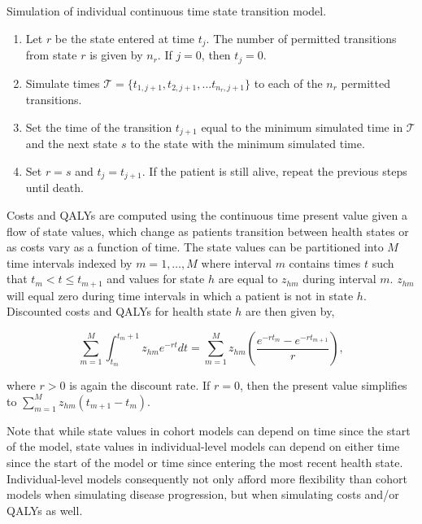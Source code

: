 \documentclass[article, nojss]{jss}\usepackage[]{graphicx}\usepackage[]{color}
\begin{document}
\begin{algorithm}
\caption{Simulation of individual continuous time state transition model.}
\label{alg:sim-ictstm}
\begin{enumerate}
\item Let $r$ be the state entered at time $t_j$. The number of permitted transitions from state $r$ is given by $n_r$. If $j=0$, then $t_j = 0$. 
\item Simulate times $\mathcal{T} = \{t_{1, j+1}, t_{2, j+1}, \ldots t_{n_r, j+1}\}$ to each of the $n_r$ permitted transitions.
\item Set the time of the transition $t_{j+1}$ equal to the minimum simulated time in $\mathcal{T}$ and the next state $s$ to the state with the minimum simulated time.
\item Set $r=s$ and $t_j = t_{j+1}$. If the patient is still alive, repeat the previous steps until death.
\end{enumerate}
\end{algorithm}

Costs and QALYs are computed using the continuous time present value given a flow of state values, which change as patients transition between health states or as costs vary as a function of time. The state values can be partitioned into $M$ time intervals indexed by $m = 1,\ldots, M$ where interval $m$ contains times $t$ such that $t_m < t \leq t_{m+1}$ and values for state $h$ are equal to $z_{hm}$ during interval $m$. $z_{hm}$ will equal zero during time intervals in which a patient is not in state $h$. Discounted costs and QALYs for health state $h$ are then given by,  

\begin{equation}
\sum_{m = 1}^M \int_{t_m}^{t_m+1} z_{hm}e^{-rt}dt = \sum_{m = 1}^M z_{hm} \left(\frac{e^{-r{t_{m}}} - e^{-r{t_{m+1}}}}{r}\right),
\end{equation}

where $r > 0$ is again the discount rate. If $r = 0$, then the present value simplifies to $\sum_{m = 1}^M z_{hm}(t_{m+1} - t_{m})$. 

Note that while state values in cohort models can depend on time since the start of the model, state values in individual-level models can depend on either time since the start of the model or time since entering the most recent health state. Individual-level models consequently not only afford more flexibility than cohort models when simulating disease progression, but when simulating costs and/or QALYs as well.
\end{document}
